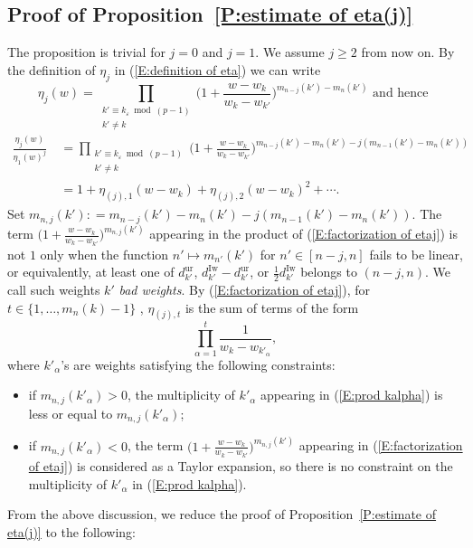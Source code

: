 \documentclass[12pt]{amsart}
\theoremstyle{definition}
\numberwithin{equation}{subsection}
\newcommand{\Iw}{\mathrm{Iw}}
\newcommand{\ur}{\mathrm{ur}}
\begin{document}
\subsection{Proof of Proposition~\ref{P:estimate of eta(j)}}
\label{S:proof of estimate of eta(j)}
	The proposition is trivial for $j=0$ and $j=1$. We assume $j\geq 2$ from now on.
	By the definition of $\eta_j$ in (\ref{E:definition of eta}) we can write
	\[
	\eta_j(w) = \prod_{\substack{k' \equiv k_\varepsilon \bmod(p-1)\\ k'\neq k}}\Big(1+ \frac{w-w_{k}}{w_k-w_{k'}}\Big)^{m_{n-j}(k')-m_n(k')} \text{~and hence~}
	\]
	\begin{align}
	\label{E:factorization of etaj}
	\frac{\eta_j(w)}{\eta_1(w)^j} \ &= \prod_{\substack{k' \equiv k_\varepsilon \bmod(p-1)\\ k'\neq k}}\Big(1+ \frac{w-w_{k}}{w_k-w_{k'}}\Big)^{m_{n-j}(k')-m_n(k') - j (m_{n-1}(k')-m_n(k'))}\\ \nonumber
	&= 1+\eta_{(j),1}(w-w_k)+\eta_{(j),2}(w-w_k)^2+\cdots.
	\end{align}
	Set $m_{n,j}(k'): = m_{n-j}(k')-m_n(k') - j (m_{n-1}(k')-m_n(k'))$. The term $\big(1+\tfrac {w-w_k}{w_k-w_{k'}} \big)^{m_{n,j}(k')}$ appearing in the product of (\ref{E:factorization of etaj}) is not $1$ only when the function $n' \mapsto m_{n'}(k')$ for $n' \in [n-j, n]$ fails to be linear, or equivalently, at least one of $d_{k'}^\ur$, $ d_{k'}^\Iw -d_{k'}^\ur$, or $\frac 12d_{k'}^\Iw $ belongs to $(n-j,n)$. We call such weights $k'$ \emph{bad weights}. By (\ref{E:factorization of etaj}), for $t\in \{1,\dots, m_n(k)-1 \}$ , $\eta_{(j),t}$ is the sum of terms of the form
	\begin{equation}
	\label{E:prod kalpha}
	\prod_{\alpha =1}^t \frac{1}{w_k-w_{k'_\alpha}},
	\end{equation}
	where $k'_\alpha$'s are weights satisfying the following constraints:
	\begin{itemize}
		\item if $m_{n,j}(k'_\alpha)>0$, the multiplicity of $k'_\alpha$ appearing in (\ref{E:prod kalpha}) is less or equal to $m_{n,j}(k'_\alpha)$;
		\item if $m_{n,j}(k'_\alpha)<0$, the term $\big(1+\tfrac {w-w_k}{w_k-w_{k'}} \big)^{m_{n,j}(k')}$ appearing in (\ref{E:factorization of etaj}) is considered as a Taylor expansion,  so there is no constraint on the multiplicity of $k'_\alpha$ in (\ref{E:prod kalpha}).
	\end{itemize}
	From the above discussion, we reduce the proof of Proposition~\ref{P:estimate of eta(j)} to the following:
\end{document}
